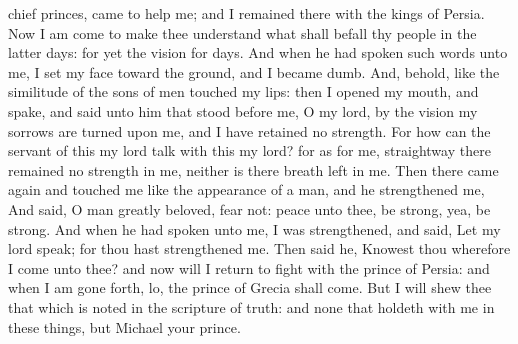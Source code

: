 {chief
princes,
came to
help me; and I
remained there
with the
kings of
Persia.
Now I am
come to make thee
understand what shall
befall thy
people in the
latter
days: for yet the
vision
{} for
{}
days.
And when he had
spoken such
words unto me, I
set my
face toward the
ground, and I became
dumb.
And, behold,
{} like the
similitude of the
sons of
men
touched my
lips: then I
opened my
mouth, and
spake, and
said unto him that
stood before me, O my
lord, by the
vision my
sorrows are
turned upon me, and I have
retained no
strength.
For
how
can the
servant of this my
lord
talk with this my
lord? for as for me,
straightway there
remained no
strength in me, neither is there
breath
left in me.
Then there came
again and
touched me
{} like the
appearance of a
man, and he
strengthened me,
And
said, O
man greatly
beloved,
fear not:
peace
{} unto thee, be
strong, yea, be
strong. And when he had
spoken unto me, I was
strengthened, and
said, Let my
lord
speak; for thou hast
strengthened me.
Then
said he,
Knowest thou wherefore I
come unto thee? and now will I
return to
fight with the
prince of
Persia: and when I am gone
forth, lo, the
prince of
Grecia shall
come.
But I will
shew thee that which is
noted in the
scripture of
truth: and
{}
none that
holdeth with me in these things, but
Michael your
prince.

}
